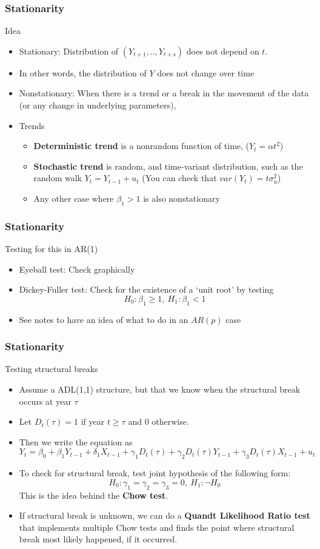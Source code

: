 \documentclass[compress]{beamer}
\begin{document}
\begin{frame}
\frametitle{Stationarity}
Idea
\begin{itemize}
\item Stationary: Distribution of $(Y_{t+1},..,Y_{t+s})$ does not depend on $t$. 
\item In other words, the distribution of $Y$ does not change over time
\item Nonstationary:  When there is a trend or a break in the movement of the data (or any change in underlying parameters), 
\item Trends
\begin{itemize}
\item \textbf{Deterministic trend} is a nonrandom  function of time, ($Y_t = \alpha t^2$)
\item \textbf{Stochastic trend} is random, and time-variant distribution, such as the random walk $Y_t = Y_{t-1}+u_t$  (You can check that $var(Y_t)=t\sigma_u^2$)
\item Any other case where $\beta_1>1$ is also nonstationary
\end{itemize} 
\end{itemize}
\end{frame}

\begin{frame}
\frametitle{Stationarity}
Testing for this in AR(1)
\begin{itemize}
\item Eyeball test: Check graphically
\item Dickey-Fuller test: Check for the existence of a `unit root' by testing
\[
H_0: \beta_1\geq 1,\ H_1 : \beta_1<1 
\]
\item See notes to have an idea of what to do in an $AR(p)$ case
\end{itemize}
\end{frame}

\begin{frame}
\frametitle{Stationarity}
Testing structural breaks
\begin{itemize}
\item Assume a ADL(1,1) structure, but that we know when the structural break occurs at year $\tau$ 
\item Let $D_t(\tau)=1$ if year $t\geq\tau$ and 0 otherwise. 
\item Then we write the equation as
\[
Y_t = \beta_0 +\beta_1Y_{t-1}+\delta_1 X_{t-1} + \gamma_1 D_t(\tau)+\gamma_2 D_t(\tau)Y_{t-1}+\gamma_3 D_t(\tau)X_{t-1}+u_t
\]
\item To check for structural break, test joint hypothesis of the following form:
\[
H_0: \gamma_1 = \gamma_2 = \gamma_3 =0, \ H_1: \lnot H_0
\]
This is the idea behind the \textbf{Chow test}. 
\item If structural break is unknown, we can do a \textbf{Quandt Likelihood Ratio test} that implements multiple Chow tests and finds the point where structural break most likely happened, if it occurred.  
\end{itemize}
\end{frame}
\end{document}
